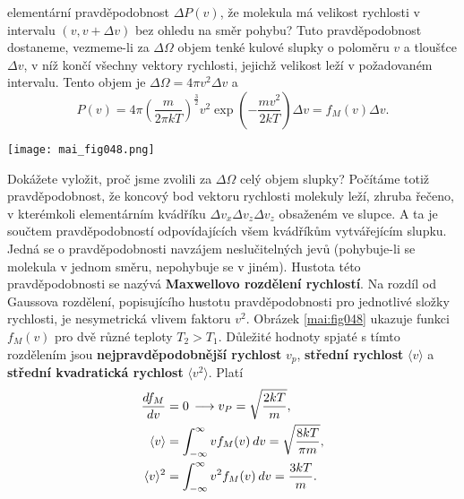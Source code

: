 \begin{example}
  elementární pravděpodobnost \(\Delta P(v)\), že molekula má velikost rychlosti v intervalu \((v, 
  v + \Delta v)\) bez ohledu na směr pohybu? Tuto pravděpodobnost dostaneme, vezmeme-li za 
  \(\Delta\Omega\) objem tenké kulové slupky o poloměru \(v\) a tloušťce \(\Delta v\), v níž končí 
  všechny vektory rychlosti, jejichž velikost leží v požadovaném intervalu. Tento objem je 
  \(\Delta\Omega = 4\pi v^2\Delta v\) a
  \begin{equation*}
    P(v) = 4\pi\left(\dfrac{m}{2\pi kT}\right)^{\frac{3}{2}}v^2
               \exp\left(- \dfrac{mv^2}{2 kT}\right)\Delta v = f_M(v)\Delta v. 
  \end{equation*}

  {\centering
   \captionsetup{type=figure}
   \texttt{[image: mai\_fig048.png]}
  \par}
  
  Dokážete vyložit, proč jsme zvolili za \(\Delta\Omega\) celý objem slupky? Počítáme totiž 
  pravděpodobnost, že koncový bod vektoru rychlosti molekuly leží, zhruba řečeno, v kterémkoli 
  elementárním kvádříku \(\Delta v_x\Delta v_z\Delta v_z\) obsaženém ve slupce. A ta je součtem 
  pravděpodobností odpovídajících všem kvádříkům vytvářejícím slupku. Jedná se o pravděpodobnosti 
  navzájem neslučitelných jevů (pohybuje-li se molekula v jednom směru, nepohybuje se v jiném). 
  Hustota této pravděpodobnosti se nazývá \textbf{Maxwellovo rozdělení rychlostí}. Na rozdíl od 
  Gaussova rozdělení, popisujícího hustotu pravděpodobnosti pro jednotlivé složky rychlosti, je 
  nesymetrická vlivem faktoru \(v^2\). Obrázek \ref{mai:fig048} ukazuje funkci \(f_M(v)\) pro dvě 
  různé teploty \(T_2 > T_1\). Důležité hodnoty spjaté s tímto rozdělením jsou 
  \textbf{nejpravděpodobnější rychlost} \(v_p\), \textbf{střední rychlost} \(\langle v \rangle\) a 
  \textbf{střední kvadratická rychlost} \(\langle v^2 \rangle\). Platí
  \begin{align*}
    \dfrac{d f_M}{d v}        &= 0\, \longrightarrow v_P = \sqrt{\dfrac{2kT}{m}},                      \\
    \langle v \rangle   &= \int_{-\infty}^{\infty}vf_M(v)\hspace{2pt}dv = \sqrt{\dfrac{8kT}{\pi m}},     \\
    \langle v \rangle^2 &= \int_{-\infty}^{\infty}v^2f_M(v)\hspace{2pt}dv = \dfrac{3kT}{m}.
  \end{align*}
\normalsize
\end{example}